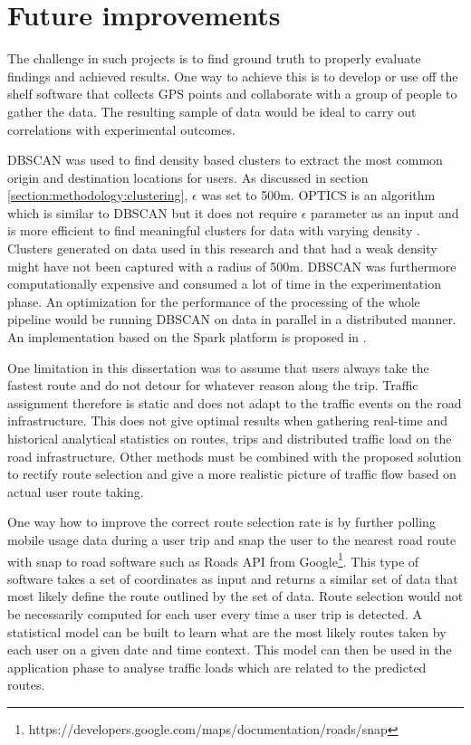 \documentclass[12pt, a4paper]{report}
\theoremstyle{definition}
\theoremstyle{definition}%
\theoremstyle{definition}%
\theoremstyle{definition}%
\theoremstyle{definition}%
\theoremstyle{definition}%
\begin{document}
\section{Future improvements} \label{section:future_improvements}


The challenge in such projects is to find ground truth to properly evaluate findings and achieved results. One way to achieve this is to develop or use off the shelf software that collects GPS points and collaborate with a group of people to gather the data. The resulting sample of data would be ideal to carry out correlations with experimental outcomes.

DBSCAN was used to find density based clusters to extract the most common origin and destination locations for users. As discussed in section \ref{section:methodology:clustering}, $\epsilon$ was set to 500m. OPTICS is an algorithm which is similar to DBSCAN but it does not require $\epsilon$ parameter as an input and is more efficient to find meaningful clusters for data with varying density \cite{Ankerst1999}. Clusters generated on data used in this research and that had a weak density might have not been captured with a radius of 500m. DBSCAN was furthermore computationally expensive and consumed a lot of time in the experimentation phase. An optimization for the performance of the processing of the whole pipeline would be running DBSCAN on data in parallel in a distributed manner. An implementation based on the Spark platform is proposed in \cite{huang2017research}.

One limitation in this dissertation was to assume that users always take the fastest route and do not detour for whatever reason along the trip. Traffic assignment therefore is static and does not adapt to the traffic events on the road infrastructure. This does not give optimal results when gathering real-time and historical analytical statistics on routes, trips and distributed traffic load on the road infrastructure. Other methods must be combined with the proposed solution to rectify route selection and give a more realistic picture of traffic flow based on actual user route taking. 

One way how to improve the correct route selection rate is by further polling mobile usage data during a user trip and snap the user to the nearest road route with snap to road software such as Roads API from Google\footnote{https://developers.google.com/maps/documentation/roads/snap}. This type of software takes a set of coordinates as input and returns a similar set of data that most likely define the route outlined by the set of data. Route selection would not be necessarily computed for each user every time a user trip is detected. A statistical model can be built to learn what are the most likely routes taken by each user on a given date and time context. This model can then be used in the application phase to analyse traffic loads which are related to the predicted routes.
\end{document}
